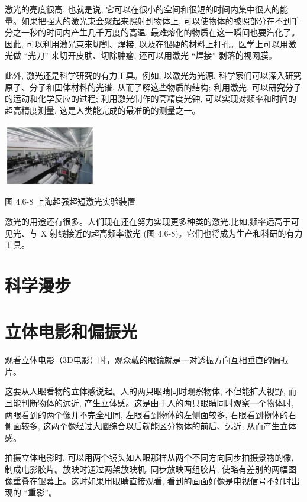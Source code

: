 \documentclass[10pt]{article}
\begin{document}
激光的亮度很高, 也就是说, 它可以在很小的空间和很短的时间内集中很大的能量。如果把强大的激光束会聚起来照射到物体上, 可以使物体的被照部分在不到千分之一秒的时间内产生几千万度的高温, 最难熔化的物质在这一瞬间也要汽化了。因此, 可以利用激光束来切割、焊接, 以及在很硬的材料上打孔。医学上可以用激光做 “光刀” 来切开皮肤、切除肿瘤, 还可以用激光 “焊接” 剥落的视网膜。

此外, 激光还是科学研究的有力工具。例如, 以激光为光源, 科学家们可以深入研究原子、分子和固体材料的光谱, 从而了解这些物质的结构; 利用激光, 可以研究分子的运动和化学反应的过程; 利用激光制作的高精度光钟, 可以实现对频率和时间的超高精度测量, 这是人类能完成的最准确的测量之一。

\begin{center}
\includegraphics[max width=0.3\textwidth]{images/01910e4c-ebb8-7d2c-8f2f-2375bc1d2d12_117_566791.jpg}
\end{center}

图 4.6-8 上海超强超短激光实验装置

激光的用途还有很多。人们现在还在努力实现更多种类的激光,比如,频率远高于可见光、与 \(\mathrm{X}\) 射线接近的超高频率激光 (图 4.6-8)。它们也将成为生产和科研的有力工具。

\section*{科学漫步}

\section*{立体电影和偏振光}

观看立体电影（3D电影）时，观众戴的眼镜就是一对透振方向互相垂直的偏振片。

这要从人眼看物的立体感说起。人的两只眼睛同时观察物体, 不但能扩大视野, 而且能判断物体的远近, 产生立体感。这是由于人的两只眼睛同时观察一个物体时, 两眼看到的两个像并不完全相同, 左眼看到物体的左侧面较多, 右眼看到物体的右侧面较多, 这两个像经过大脑综合以后就能区分物体的前后、远近, 从而产生立体感。

拍摄立体电影时, 可以用两个镜头如人眼那样从两个不同方向同步拍摄景物的像, 制成电影胶片。放映时通过两架放映机, 同步放映两组胶片, 使略有差别的两幅图像重叠在银幕上。这时如果用眼睛直接观看, 看到的画面好像是电视信号不好时出现的 “重影”。
\end{document}
